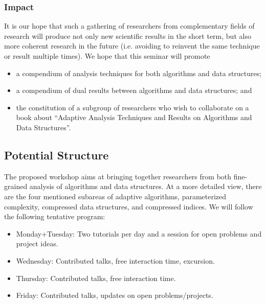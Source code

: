 \documentclass[a4paper,10pt]{article}
\begin{document}



\subsubsection{Impact}
\label{sec:impact}

It is our hope that such a gathering of researchers from complementary fields of research will produce not only new scientific results in the short term, but also more coherent research in the future (i.e. avoiding to reinvent the same technique or result multiple times). We hope that this seminar will promote
\begin{itemize}
\item a compendium of analysis techniques for both algorithms and data structures; 
\item a compendium of dual results between algorithms and data structures; and
\item the constitution of a subgroup of researchers who wish to collaborate on a book about ``Adaptive Analysis Techniques and Results on Algorithms and Data Structures''.
\end{itemize}


\subsection{Potential Structure}

The proposed workshop aims at bringing together researchers from both fine-grained analysis of algorithms and data structures. At a more detailed view, there are the four mentioned subareas of adaptive algorithms, parameterized complexity, compressed data structures, and compressed indices. We will follow the following tentative program:
\begin{itemize}
 \item Monday+Tuesday: Two tutorials per day and a session for open problems and project ideas.
 \item Wednesday: Contributed talks, free interaction time, excursion.
 \item Thursday: Contributed talks, free interaction time.
 \item Friday: Contributed talks, updates on open problems/projects.
\end{itemize}
\end{document}
